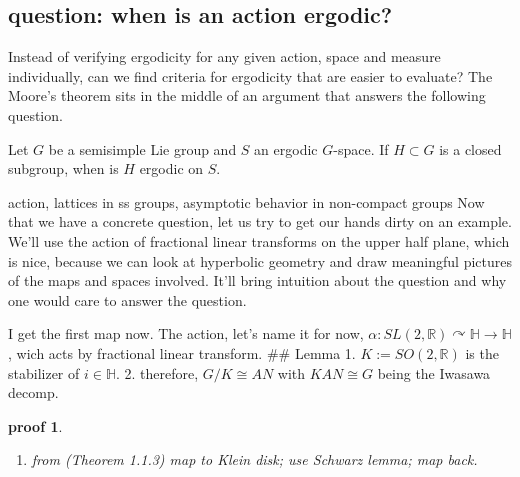 \documentclass[
  12pt
]{article}
\providecommand{\tightlist}{%
  \setlength{\itemsep}{0pt}\setlength{\parskip}{0pt}}
\theoremstyle{break}
\theoremstyle{plain}
\newtheorem*{pf}{proof}
\begin{document}
  \hypertarget{question-when-is-an-action-ergodic}{%
  \subsection{question: when is an action
  ergodic?}\label{question-when-is-an-action-ergodic}}

  Instead of verifying ergodicity for any given action, space and measure
  individually, can we find criteria for ergodicity that are easier to
  evaluate? The Moore's theorem sits in the middle of an argument that
  answers the following question.

  Let $G$ be a semisimple Lie group and $S$ an ergodic $G$-space. If
  $H\subset G$ is a closed subgroup, when is $H$ ergodic on $S$.


  action, lattices in ss groups, asymptotic behavior in non-compact groups
  \cite{howe79}
  Now that we have a concrete question, let us try to get our hands dirty
  on an example. We'll use the action of fractional linear transforms on
  the upper half plane, which is nice, because we can look at hyperbolic
  geometry and draw meaningful pictures of the maps and spaces involved.
  It'll bring intuition about the question and why one would care to
  answer the question.

  I get the first map now. The action, let's name it for now,
  $\alpha : SL(2, \mathbb{R}) \curvearrowright \mathbb{H} \rightarrow \mathbb{H}$,
  wich acts by fractional linear transform. \#\# Lemma 1.
  $K:= SO(2, \mathbb{R})$ is the stabilizer of $i \in \mathbb{H}$. 2.
  therefore, $G/K \cong AN$ with $KAN \cong G$ being the Iwasawa
  decomp.

  \begin{pf}\label{pf:miyake}
  \begin{enumerate}
  \def\labelenumi{\arabic{enumi}.}
  \tightlist
  \item
    from \cite{Miyake89}(Theorem 1.1.3) map to Klein disk; use Schwarz
    lemma; map back.
  \end{enumerate}
  \end{pf}
\end{document}
